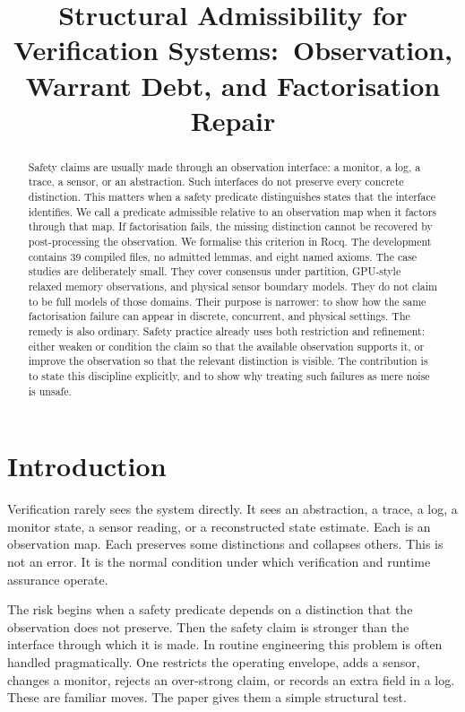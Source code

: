 \documentclass[a4paper,11pt]{article}
\title{%
  Structural Admissibility for Verification Systems:\
  Observation, Warrant Debt, and Factorisation Repair%
}
\author{%
}
\date{}
\begin{document}
\maketitle

\begin{abstract}
Safety claims are usually made through an observation interface: a monitor, a
log, a trace, a sensor, or an abstraction. Such interfaces do not preserve every
concrete distinction. This matters when a safety predicate distinguishes states
that the interface identifies. We call a predicate admissible relative to an
observation map when it factors through that map. If factorisation fails, the
missing distinction cannot be recovered by post-processing the observation. We
formalise this criterion in Rocq. The development contains 39 compiled files, no
admitted lemmas, and eight named axioms. The case studies are deliberately
small. They cover consensus under partition, GPU-style relaxed memory
observations, and physical sensor boundary models. They do not claim to be full
models of those domains. Their purpose is narrower: to show how the same
factorisation failure can appear in discrete, concurrent, and physical settings.
The remedy is also ordinary. Safety practice already uses both restriction and
refinement: either weaken or condition the claim so that the available
observation supports it, or improve the observation so that the relevant
distinction is visible. The contribution is to state this discipline explicitly,
and to show why treating such failures as mere noise is unsafe.
\end{abstract}

\section{Introduction}
\label{sec:introduction}

Verification rarely sees the system directly. It sees an abstraction, a trace, a
log, a monitor state, a sensor reading, or a reconstructed state estimate. Each
is an observation map. Each preserves some distinctions and collapses others.
This is not an error. It is the normal condition under which verification and
runtime assurance operate.

The risk begins when a safety predicate depends on a distinction that the
observation does not preserve. Then the safety claim is stronger than the
interface through which it is made. In routine engineering this problem is often
handled pragmatically. One restricts the operating envelope, adds a sensor,
changes a monitor, rejects an over-strong claim, or records an extra field in a
log. These are familiar moves. The paper gives them a simple structural test.
\end{document}
